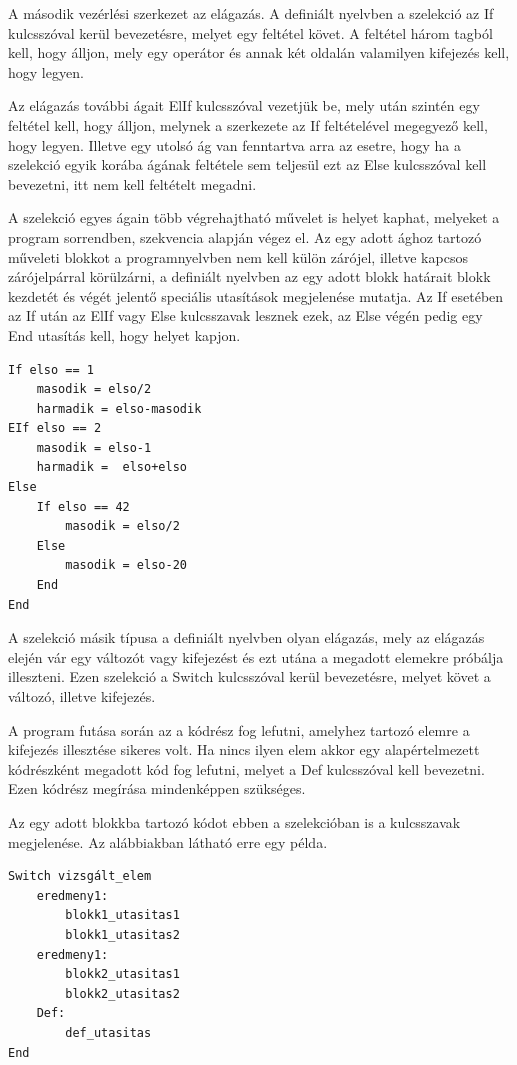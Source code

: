 A második vezérlési szerkezet az elágazás. A definiált nyelvben a szelekció az If kulcsszóval kerül bevezetésre, melyet egy feltétel követ. A feltétel három tagból kell, hogy álljon, mely egy operátor és annak két oldalán valamilyen kifejezés kell, hogy legyen.

Az elágazás további ágait ElIf kulcsszóval vezetjük be, mely után szintén egy feltétel kell, hogy álljon, melynek a szerkezete az If feltételével megegyező kell, hogy legyen. Illetve egy utolsó ág van fenntartva arra az esetre, hogy ha a szelekció egyik korába ágának feltétele sem teljesül ezt az Else kulcsszóval kell bevezetni, itt nem kell feltételt megadni.

A szelekció egyes ágain több végrehajtható művelet is helyet kaphat, melyeket a program sorrendben, szekvencia alapján végez el. Az egy adott ághoz tartozó műveleti blokkot a programnyelvben nem kell külön zárójel, illetve kapcsos zárójelpárral körülzárni, a definiált nyelvben az egy adott blokk határait blokk kezdetét és végét jelentő speciális utasítások megjelenése mutatja. Az If esetében az If után az ElIf vagy Else kulcsszavak lesznek ezek, az Else végén pedig egy End utasítás kell, hogy helyet kapjon.

\begin{verbatim}
If elso == 1
	masodik = elso/2
	harmadik = elso-masodik
EIf elso == 2
	masodik = elso-1
	harmadik =  elso+elso
Else
	If elso == 42
		masodik = elso/2
	Else
		masodik = elso-20
	End
End
\end{verbatim}

A szelekció másik típusa a definiált nyelvben olyan elágazás, mely az elágazás elején vár egy változót vagy kifejezést és ezt utána a megadott elemekre próbálja illeszteni. Ezen szelekció a Switch kulcsszóval kerül bevezetésre, melyet követ a változó, illetve kifejezés.

A program futása során az a kódrész fog lefutni, amelyhez tartozó elemre a kifejezés illesztése sikeres volt. Ha nincs ilyen elem akkor egy alapértelmezett kódrészként megadott kód fog lefutni, melyet a Def kulcsszóval kell bevezetni. Ezen kódrész megírása mindenképpen szükséges.

Az egy adott blokkba tartozó kódot ebben a szelekcióban is a kulcsszavak megjelenése. Az alábbiakban látható erre egy példa.

\begin{verbatim}
Switch vizsgált_elem
	eredmeny1:
		blokk1_utasitas1
		blokk1_utasitas2
	eredmeny1:
		blokk2_utasitas1
		blokk2_utasitas2
	Def:
		def_utasitas
End
\end{verbatim}

